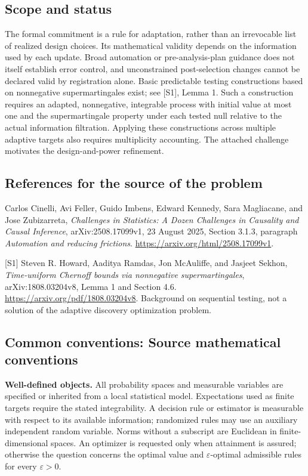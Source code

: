 \documentclass[11pt,a4paper]{article}
\begin{document}
\subsection*{Scope and status}
The formal commitment is a rule for adaptation, rather than an irrevocable list of realized design choices. Its mathematical validity depends on the information used by each update. Broad automation or pre-analysis-plan guidance does not itself establish error control, and unconstrained post-selection changes cannot be declared valid by registration alone. Basic predictable testing constructions based on nonnegative supermartingales exist; see [S1], Lemma 1. Such a construction requires an adapted, nonnegative, integrable process with initial value at most one and the supermartingale property under each tested null relative to the actual information filtration. Applying these constructions across multiple adaptive targets also requires multiplicity accounting. The attached challenge motivates the design-and-power refinement.
\subsection*{References for the source of the problem}
Carlos Cinelli, Avi Feller, Guido Imbens, Edward Kennedy, Sara Magliacane, and Jose Zubizarreta, \emph{Challenges in Statistics: A Dozen Challenges in Causality and Causal Inference}, arXiv:2508.17099v1, 23 August 2025, Section 3.1.3, paragraph \emph{Automation and reducing frictions}. \url{https://arxiv.org/html/2508.17099v1}.

[S1] Steven R. Howard, Aaditya Ramdas, Jon McAuliffe, and Jasjeet Sekhon, \emph{Time-uniform Chernoff bounds via nonnegative supermartingales}, arXiv:1808.03204v8, Lemma 1 and Section 4.6. \url{https://arxiv.org/pdf/1808.03204v8}. Background on sequential testing, not a solution of the adaptive discovery optimization problem.

\subsection*{Common conventions: Source mathematical conventions}

\textbf{Well-defined objects.}
All probability spaces and measurable variables are specified or inherited
from a local statistical model. Expectations used as finite targets require
the stated integrability. A decision rule or estimator is measurable with
respect to its available information; randomized rules may use an auxiliary
independent random variable. Norms without a subscript are Euclidean in
finite-dimensional spaces. An optimizer is requested only when attainment
is assured; otherwise the question concerns the optimal value and
$\varepsilon$-optimal admissible rules for every $\varepsilon>0$.
\end{document}
